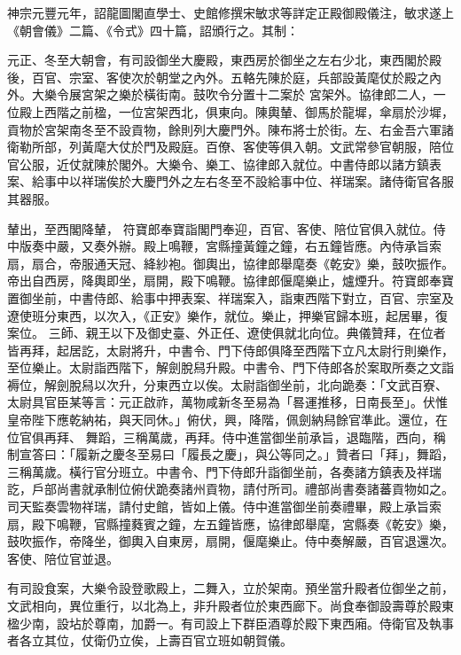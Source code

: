 \begin{pinyinscope}
 神宗元豐元年，詔龍圖閣直學士、史館修撰宋敏求等詳定正殿御殿儀注，敏求遂上《朝會儀》二篇、《令式》四十篇，詔頒行之。其制：



 元正、冬至大朝會，有司設御坐大慶殿，東西房於御坐之左右少北，東西閣於殿後，百官、宗室、客使次於朝堂之內外。五輅先陳於庭，兵部設黃麾仗於殿之內外。大樂令展宮架之樂於橫街南。鼓吹令分置十二案於
 宮架外。協律郎二人，一位殿上西階之前楹，一位宮架西北，俱東向。陳輿輦、御馬於龍墀，傘扇於沙墀，貢物於宮架南冬至不設貢物，餘則列大慶門外。陳布將士於街。左、右金吾六軍諸衛勒所部，列黃麾大仗於門及殿庭。百僚、客使等俱入朝。文武常參官朝服，陪位官公服，近仗就陳於閣外。大樂令、樂工、協律郎入就位。中書侍郎以諸方鎮表案、給事中以祥瑞俟於大慶門外之左右冬至不設給事中位、祥瑞案。諸侍衛官各服其器服。



 輦出，至西閣降輦，
 符寶郎奉寶詣閣門奉迎，百官、客使、陪位官俱入就位。侍中版奏中嚴，又奏外辦。殿上鳴鞭，宮縣撞黃鐘之鐘，右五鐘皆應。內侍承旨索扇，扇合，帝服通天冠、絳紗袍。御輿出，協律郎舉麾奏《乾安》樂，鼓吹振作。帝出自西房，降輿即坐，扇開，殿下鳴鞭。協律郎偃麾樂止，爐煙升。符寶郎奉寶置御坐前，中書侍郎、給事中押表案、祥瑞案入，詣東西階下對立，百官、宗室及遼使班分東西，以次入，《正安》樂作，就位。樂止，押樂官歸本班，起居畢，復案位。
 三師、親王以下及御史臺、外正任、遼使俱就北向位。典儀贊拜，在位者皆再拜，起居訖，太尉將升，中書令、門下侍郎俱降至西階下立凡太尉行則樂作，至位樂止。太尉詣西階下，解劍脫舄升殿。中書令、門下侍郎各於案取所奏之文詣褥位，解劍脫舄以次升，分東西立以俟。太尉詣御坐前，北向跪奏：「文武百寮、太尉具官臣某等言：元正啟祚，萬物咸新冬至易為「晷運推移，日南長至」。伏惟皇帝陛下應乾納祐，與天同休。」俯伏，興，降階，佩劍納舄餘官準此。還位，在位官俱再拜、
 舞蹈，三稱萬歲，再拜。侍中進當御坐前承旨，退臨階，西向，稱制宣答曰：「履新之慶冬至易曰「履長之慶」，與公等同之。」贊者曰「拜」，舞蹈，三稱萬歲。橫行官分班立。中書令、門下侍郎升詣御坐前，各奏諸方鎮表及祥瑞訖，戶部尚書就承制位俯伏跪奏諸州貢物，請付所司。禮部尚書奏諸蕃貢物如之。司天監奏雲物祥瑞，請付史館，皆如上儀。侍中進當御坐前奏禮畢，殿上承旨索扇，殿下鳴鞭，官縣撞蕤賓之鐘，左五鐘皆應，協律郎舉麾，宮縣奏《乾安》樂，
 鼓吹振作，帝降坐，御輿入自東房，扇開，偃麾樂止。侍中奏解嚴，百官退還次。客使、陪位官並退。



 有司設食案，大樂令設登歌殿上，二舞入，立於架南。預坐當升殿者位御坐之前，文武相向，異位重行，以北為上，非升殿者位於東西廊下。尚食奉御設壽尊於殿東楹少南，設坫於尊南，加爵一。有司設上下群臣酒尊於殿下東西廂。侍衛官及執事者各立其位，仗衛仍立俟，上壽百官立班如朝賀儀。




\end{pinyinscope}
